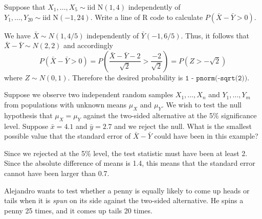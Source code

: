 \documentclass[addpoints,12pt]{exam}
\begin{document}
\begin{questions}
\question Suppose that $X_1, \dots, X_5 \sim \text{iid N}(1, 4)$ independently of $Y_1, \dots, Y_{20} \sim \text{iid N}(-1, 24)$. Write a line of R code to calculate $P(\bar{X} - \bar{Y} > 0)$.
\begin{solution}
  We have $\bar{X} \sim N(1, 4/5)$ independently of $\bar{Y}(-1, 6/5)$.
  Thus, it follows that $\bar{X} - \bar{Y} \sim N(2, 2)$ and accordingly
  \[
    P(\bar{X} - \bar{Y} > 0) = P\left( \frac{\bar{X} - \bar{Y} - 2}{\sqrt{2}} > \frac{-2}{\sqrt{2}} \right) = P(Z > -\sqrt{2})
  \]
  where $Z \sim N(0,1)$.
  Therefore the desired probability is $\texttt{1 - pnorm(-sqrt(2))}$.
\end{solution}

\question Suppose we observe two independent random samples $X_1, \dots, X_n$ and $Y_1, \dots, Y_m$ from populations with unknown means $\mu_X$ and $\mu_Y$. We wish to test the null hypothesis that $\mu_X = \mu_Y$ against the two-sided alternative at the 5\% significance level. Suppose $\bar{x} = 4.1$ and $\bar{y} = 2.7$ and we reject the null. What is the smallest possible value that the standard error of $\bar{X} - \bar{Y}$ could have been in this example?
\begin{solution}
  Since we rejected at the 5\% level, the test statistic must have been at least 2. 
Since the absolute difference of means is 1.4, this means that the standard error cannot have been larger than 0.7.
\end{solution}




\question Alejandro wants to test whether a penny is equally likely to come up heads or tails when it is \emph{spun} on its side against the two-sided alternative. He spins a penny 25 times, and it comes up tails 20 times. 
\end{questions}
\end{document}

